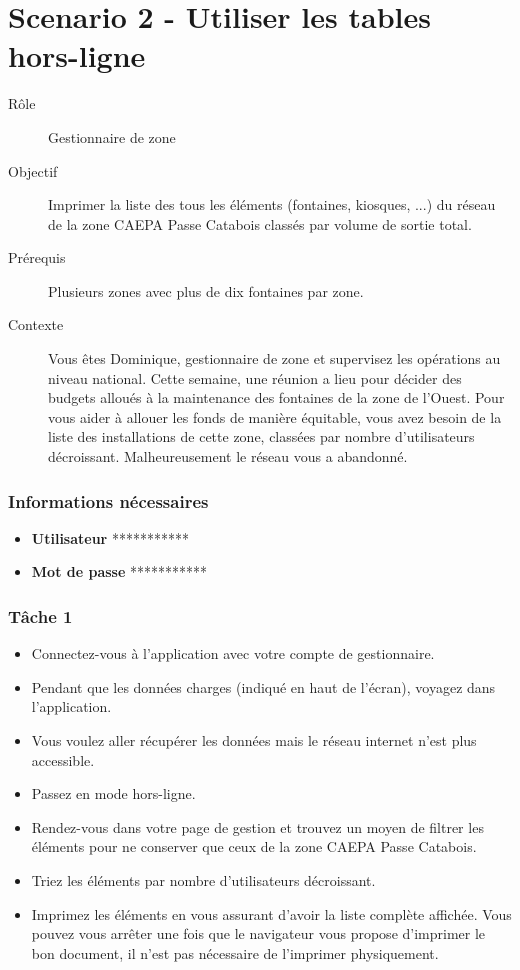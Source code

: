 \documentclass{EPL-master-thesis-covers-FR}
\begin{document}
\newpage
			\section*{Scenario 2 - Utiliser les tables hors-ligne}
				\begin{description}
					\item[Rôle] Gestionnaire de zone
					\item[Objectif] Imprimer la liste des tous les éléments (fontaines, kiosques, ...) du réseau de la zone CAEPA Passe Catabois classés par volume de sortie total.
					\item[Prérequis] Plusieurs zones avec plus de dix fontaines par zone. 
					\item[Contexte] Vous êtes Dominique, gestionnaire de zone et supervisez les opérations au niveau national. Cette semaine, une réunion a lieu pour décider des budgets alloués à la maintenance des fontaines de la zone de l’Ouest. Pour vous aider à allouer les fonds de manière équitable, vous avez besoin de la liste des installations de cette zone, classées par nombre d’utilisateurs décroissant. Malheureusement le réseau vous a abandonné. 
				\end{description}
							
				\subsubsection*{Informations nécessaires}
					\begin{itemize}[noitemsep, label={}]
						\item \textbf{Utilisateur} ***********
						\item \textbf{Mot de passe} ***********
					\end{itemize}
					
				\subsubsection*{Tâche 1}
					\begin{itemize}
						\item Connectez-vous à l’application avec votre compte de gestionnaire. 
						\item Pendant que les données charges (indiqué en haut de l’écran), voyagez dans l’application. 
						\item Vous voulez aller récupérer les données mais le réseau internet n’est plus accessible. 
						\item Passez en mode hors-ligne. 
						\item Rendez-vous dans votre page de gestion et trouvez un moyen de filtrer les éléments pour ne conserver que ceux de la zone CAEPA Passe Catabois. 
						\item Triez les éléments par nombre d’utilisateurs décroissant. 
						\item Imprimez les éléments en vous assurant d’avoir la liste complète affichée. Vous pouvez vous arrêter une fois que le navigateur vous propose d’imprimer le bon document, il n’est pas nécessaire de l’imprimer physiquement. 
					\end{itemize}
					
\end{document}
